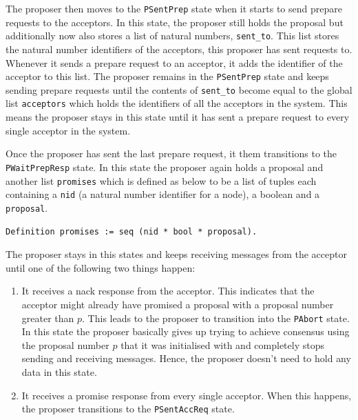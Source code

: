 The proposer then moves to the \texttt{PSentPrep} state when it starts to send prepare
requests to the acceptors. In this state, the proposer still holds the proposal
but additionally now also stores a list of natural numbers, \texttt{sent\_to}. This list stores the
natural number identifiers of the acceptors, this proposer has sent requests to.
Whenever it sends a prepare request to an acceptor, it adds the identifier of
the acceptor to this list.
The proposer remains in the \texttt{PSentPrep} state and keeps sending prepare requests
until the contents of \texttt{sent\_to} become equal to the global list \texttt{acceptors} which
holds the identifiers of all the acceptors in the system. This means the proposer
stays in this state until it has sent a prepare request to every single acceptor
in the system.

Once the proposer has sent the last prepare request, it them transitions to
the \texttt{PWaitPrepResp} state. In this state the proposer again holds a proposal and
another list \texttt{promises} which is defined as below to be a list of tuples
each containing a \texttt{nid} (a natural number identifier for a node), a boolean
and a \texttt{proposal}.

\texttt{Definition promises := seq (nid * bool * proposal).}

The proposer stays in this states and keeps receiving messages from the acceptor
until one of the following two things happen:
\begin{enumerate}
  \item It receives a nack response from the acceptor. This indicates that the
    acceptor might already have promised a proposal
    with a proposal number greater than $p$. This leads to the proposer to
    transition into the \texttt{PAbort} state. In this state the proposer basically
    gives up trying to achieve consensus using the proposal number $p$ that it was
    initialised with and completely stops sending and receiving messages. Hence,
    the proposer doesn't need to hold any data in this state.
  \item It receives a promise response from every single acceptor. When this
    happens, the proposer transitions to the \texttt{PSentAccReq} state.
\end{enumerate}

